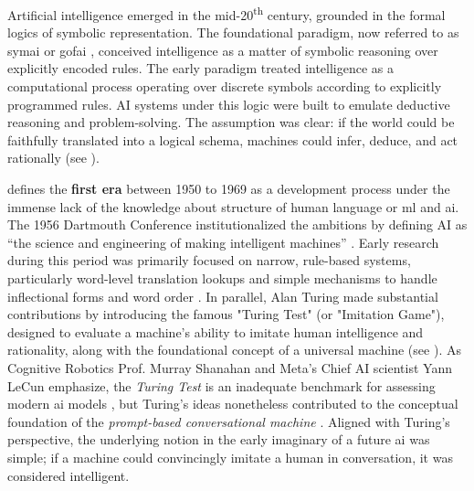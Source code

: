 

\greensquare
Artificial intelligence emerged in the mid-20\textsuperscript{th} century, grounded in the formal logics of symbolic representation. The foundational paradigm, now referred to as \gls{symai} or \gls{gofai} , conceived intelligence as a matter of symbolic reasoning over explicitly encoded rules. The early paradigm treated intelligence as a computational process operating over discrete symbols according to explicitly programmed rules. AI systems under this logic were built to emulate deductive reasoning and problem-solving. The assumption was clear: if the world could be faithfully translated into a logical schema, machines could infer, deduce, and act rationally (see \cite[183]{eloff2021}).

\greensquare
\textcite{manning2022a} defines the \textbf{first era} between 1950 to 1969 as a development process under the immense lack of
the knowledge about structure of human language or \gls{ml} and \gls{ai}. The
1956 Dartmouth Conference institutionalized the ambitions by defining AI as
``the science and engineering of making intelligent machines''
\parencite[195]{montanari2025}. Early research during this period was primarily focused on narrow, rule-based systems, particularly word-level translation lookups and simple mechanisms to handle inflectional forms and word order \parencite[128]{manning2022a}.
In parallel, Alan Turing made substantial contributions by introducing the famous "Turing Test" (or "Imitation Game"), designed to evaluate a machine's ability to imitate human intelligence and rationality, along with the foundational concept of a universal machine (see \cite[196]{montanari2025}). As Cognitive Robotics Prof. Murray Shanahan and Meta's Chief AI scientist Yann LeCun emphasize, the \textit{Turing Test} is an inadequate benchmark for assessing modern \gls{ai} models \parencite[]{lexfridman2024, googledeepmind2025}, but Turing's ideas nonetheless contributed to the conceptual foundation of the \textit{prompt-based conversational machine} \parencite[196]{montanari2025}. Aligned with Turing's perspective, the underlying notion in the early imaginary of a future \gls{ai} was simple; if a machine could convincingly imitate a human in conversation, it was considered intelligent.

